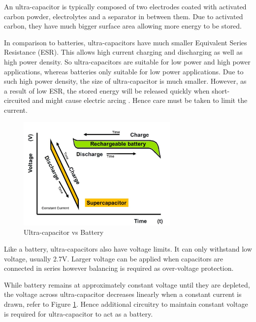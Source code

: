 An ultra-capacitor is typically composed of two electrodes coated with activated carbon powder, electrolytes and a separator in between them. Due to activated carbon, they have much bigger surface area allowing more energy to be stored. 

In comparison to batteries, ultra-capacitors have much smaller Equivalent Series Resistance (ESR). This allows high current charging and discharging as well as high power density. So ultra-capacitors are suitable for low power and high power applications, whereas batteries only suitable for low power applications. Due to such high power density, the size of ultra-capacitor is much smaller. However, as a result of low ESR, the stored energy will be released quickly when short-circuited and might cause electric arcing \cite{murata}. Hence care must be taken to limit the current. 

\begin{figure}[h]
    \centering
    \includegraphics[width=0.7\textwidth]{figures/ultracap_battery.pdf}
    \caption{Ultra-capacitor vs Battery \cite{ultracap_fig}}
    \label{fig:comparison}
\end{figure}

Like a battery, ultra-capacitors also have voltage limits. It can only withstand low voltage, usually 2.7V. Larger voltage can be applied when capacitors are connected in series however balancing is required as over-voltage protection. 

While battery remains at approximately constant voltage until they are depleted, the voltage across ultra-capacitor decreases linearly when a constant current is drawn, refer to Figure \ref{fig:comparison}. Hence additional circuitry to maintain constant voltage is required for ultra-capacitor to act as a battery.

